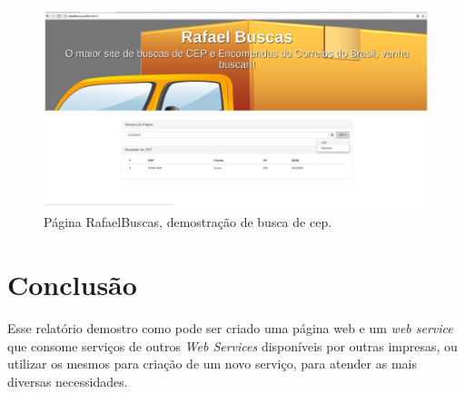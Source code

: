 \documentclass[12pt]{article}
\begin{document}
	  		 \begin{figure}[H]
	  		\centering
	  		\includegraphics[scale=0.23]{Imagens/c2.jpg}
	  		\caption{Página RafaelBuscas, demostração de busca de cep.}
	  		\label{c2}
	  	\end{figure}
\section{Conclusão}
Esse relatório demostro como pode ser criado uma página web e um \textit{web service}  que consome serviços de outros \textit{Web Services} disponíveis por outras impresas, ou utilizar os mesmos para criação de um novo serviço, para atender as mais diversas necessidades.	  	

	  
\end{document}
